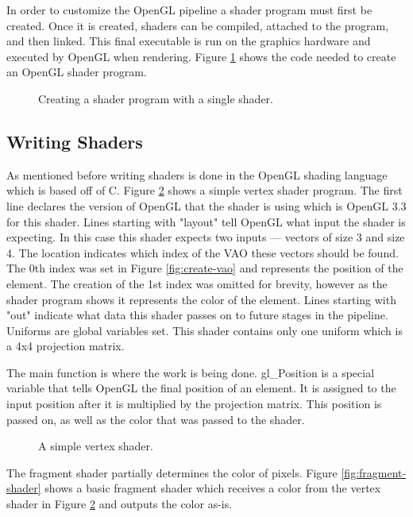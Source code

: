 \documentclass{article}
\begin{document}
In order to customize the OpenGL pipeline a shader program must first be created. Once it is created, shaders can be compiled, attached to the program, and then linked. This final executable is run on the graphics hardware and executed by OpenGL when rendering. Figure \ref{fig:shader-program} shows the code needed to create an OpenGL shader program.

\begin{figure}[b]
	
	\caption{Creating a shader program with a single shader.}
	\label{fig:shader-program}
\end{figure}

\subsection{Writing Shaders}

As mentioned before writing shaders is done in the OpenGL shading language which is based off of C. Figure \ref{fig:vertex-shader} shows a simple vertex shader program. The first line declares the version of OpenGL that the shader is using which is OpenGL 3.3 for this shader. Lines starting with "layout" tell OpenGL what input the shader is expecting. In this case this shader expects two inputs --- vectors of size 3 and size 4. The location indicates which index of the VAO these vectors should be found. The 0th index was set in Figure \ref{fig:create-vao} and represents the position of the element. The creation of the 1st index was omitted for brevity, however as the shader program shows it represents the color of the element. Lines starting with "out" indicate what data this shader passes on to future stages in the pipeline. Uniforms are global variables set. This shader contains only one uniform which is a 4x4 projection matrix.

The main function is where the work is being done. gl\_Position is a special variable that tells OpenGL the final position of an element. It is assigned to the input position after it is multiplied by the projection matrix. This position is passed on, as well as the color that was passed to the shader.

\begin{figure}[h]
	
	\caption{A simple vertex shader.}
	\label{fig:vertex-shader}
\end{figure}

The fragment shader partially determines the color of pixels. Figure \ref{fig:fragment-shader} shows a basic fragment shader which receives a color from the vertex shader in Figure \ref{fig:vertex-shader} and outputs the color as-is.
\end{document}
